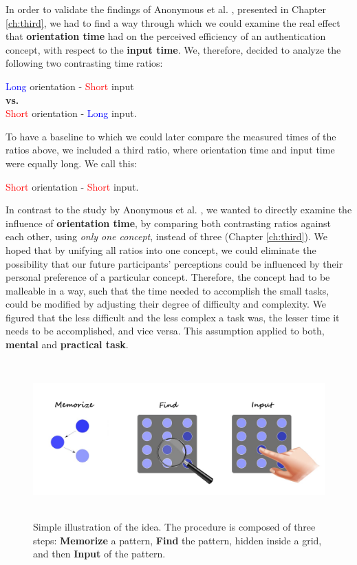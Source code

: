 In order to validate the findings of Anonymous et al. \cite{anonymous}, presented in Chapter \ref{ch:third}, we had to find a way through which we could examine the real effect that \textbf{orientation time} had on the perceived efficiency of an authentication concept, with respect to the \textbf{input time}. We, therefore, decided to analyze the following two contrasting time ratios:  
\begin{center}
    \textcolor{blue}{Long} orientation - \textcolor{red}{Short} input \\
    \textbf{vs.} \\
    \textcolor{red}{Short} orientation - \textcolor{blue}{Long} input.
\end{center} 

To have a baseline to which we could later compare the measured times of the ratios above, we included a third ratio, where orientation time and input time were equally long. We call this:  
\begin{center}
\textcolor{red}{Short} orientation - \textcolor{red}{Short} input.
\end{center} 

In contrast to the study by Anonymous et al. \cite{anonymous}, we wanted to directly examine the influence of \textbf{orientation time}, by comparing both contrasting ratios against each other, using \textit{only one concept}, instead of three (Chapter \ref{ch:third}). We hoped that by unifying all ratios into one concept, we could eliminate the possibility that our future participants' perceptions could be influenced by their personal preference of a particular concept. Therefore, the concept had to be malleable in a way, such that the time needed to accomplish the small tasks, could be modified by adjusting their degree of difficulty and complexity. We figured that the less difficult and the less complex a task was, the lesser time it needs to be accomplished, and vice versa. This assumption applied to both, \textbf{mental} and \textbf{practical task}.

\begin{figure}[t!]
\centering
\includegraphics[width=15cm, height=6cm]{Chapters/graphics/ConceptIdea.jpeg}
\caption{Simple illustration of the idea. The procedure is composed of three steps: \textbf{Memorize} a pattern, \textbf{Find} the pattern, hidden inside a grid, and then \textbf{Input} of the pattern.}
\label{fig:concept}
\end{figure}

